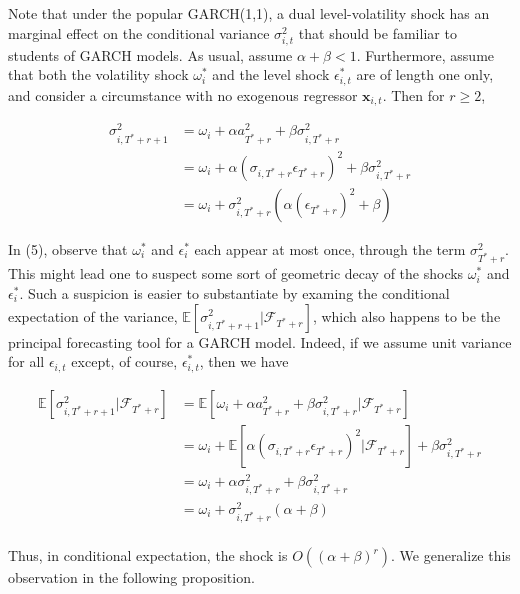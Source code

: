 \documentclass[11pt]{article}
\newcommand{\x}{\textbf{x}}
\theoremstyle{definition}
\begin{document}
Note that under the popular GARCH(1,1), a dual level-volatility shock has an marginal effect on the conditional variance $\sigma^{2}_{i,t}$ that should be familiar to students of GARCH models.  As usual, assume $\alpha+\beta < 1$.  Furthermore, assume that both the volatility shock $\omega^{*}_{i}$ and the level shock $\epsilon^{*}_{i,t}$ are of length one only, and consider a circumstance with no exogenous regressor $\x_{i,t}$. Then for $r\geq 2$,

\begin{align}
\sigma^{2}_{i,T^{*}+r+1} & = \omega_{i} + \alpha a_{T^{*}+r}^{2} + \beta\sigma^{2}_{i,T^{*}+r} \\
& = \omega_{i} + \alpha(\sigma_{i,T^{*}+r}\epsilon_{T^{*}+r})^{2} + \beta\sigma^{2}_{i,T^{*}+r} \\
& = \omega_{i} + \sigma^{2}_{i,T^{*}+r}(\alpha (\epsilon_{T^{*}+r})^{2} + \beta)
\end{align}

In (5), observe that $\omega_{i}^{*}$ and $\epsilon^{*}_{i}$ each appear at most once, through the term $\sigma^{2}_{T^{*}+r}$.  This might lead one to suspect some sort of geometric decay of the shocks $\omega_{i}^{*}$ and $\epsilon^{*}_{i}$.  Such a suspicion is easier to substantiate by examing the conditional expectation of the variance, $\mathbb{E}[ \sigma^{2}_{i,T^{*}+r+1} |\mathcal{F}_{T^{*}+r}]$, which also happens to be the principal forecasting tool for a GARCH model.  Indeed, if we assume unit variance for all $\epsilon_{i,t}$ except, of course, $\epsilon^{*}_{i,t}$, then we have 

\begin{align*}
\mathbb{E}[ \sigma^{2}_{i,T^{*}+r+1} |\mathcal{F}_{T^{*}+r}] & = \mathbb{E}[\omega_{i} + \alpha a_{T^{*}+r}^{2} + \beta\sigma^{2}_{i,T^{*}+r} |\mathcal{F}_{T^{*}+r}] \\
& = \omega_{i} + \mathbb{E}[\alpha(\sigma_{i,T^{*}+r}\epsilon_{T^{*}+r})^{2} |\mathcal{F}_{T^{*}+r}] + \beta\sigma^{2}_{i,T^{*}+r} \\
& = \omega_{i} + \alpha\sigma_{i,T^{*}+r}^{2} + \beta\sigma^{2}_{i,T^{*}+r} \tag{Due to the unit variance assumption}\\
& = \omega_{i} + \sigma^{2}_{i,T^{*}+r}(\alpha + \beta) \\
\end{align*}

Thus, in conditional expectation, the shock is $O((\alpha+\beta)^{r})$.  We generalize this observation in the following proposition.
\end{document}
